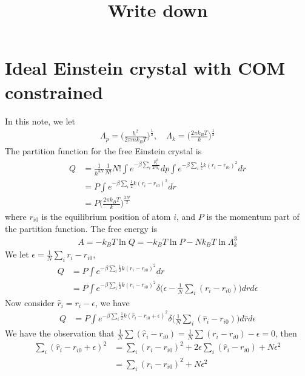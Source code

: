 \documentclass[aps,pre,a4paper,showkeys,fleqn]{revtex4}
\begin{document}
\title{
Write down
}

\maketitle

\section{Ideal Einstein crystal with COM constrained}

In this note, we let
\begin{align*}
  \Lambda_p = \Big(\frac{h^2}{2\pi m k_BT}\Big)^{\frac12}, \quad \Lambda_k = \Big(\frac{2\pi k_BT}{k}\Big)^{\frac12}
\end{align*}
The partition function for the free Einstein crystal is
\begin{align*}
  Q & =
      \frac{1}{h^{3N}}
      \frac{1}{N!} N!
      \int e^{-\beta\sum_i\frac{p_i^2}{2m_i}} dp
      \int e^{-\beta\sum_i \frac 12k(r_i - r_{i0})^2} dr \\
    &=
      P \int e^{-\beta\sum_i \frac 12k(r_i - r_{i0})^2} dr \\
    &=
      P \Big( \frac{2\pi k_BT}{k} \Big)^{\frac{3N}2}
\end{align*}
where $r_{i0}$ is the equilibrium position of atom $i$, and $P$ is the momentum part of the partition function.
The free energy is
\begin{align*}
  A = -k_BT\ln Q = -k_BT\ln P - Nk_BT\ln\Lambda_k^3
\end{align*}
We let $\epsilon = \frac1N \sum_i r_i - r_{i0}$,
\begin{align*}
  Q & =
      P \int e^{-\beta\sum_i \frac 12k(r_i - r_{i0})^2} dr \\
    & =
      P \int e^{-\beta\sum_i \frac 12k(r_i - r_{i0})^2} \delta\big( \epsilon - \frac1N \sum_i (r_i - r_{i0}) \big) dr d\epsilon
\end{align*}
Now consider $\hat r_i = r_i - \epsilon$, we have
\begin{align}\label{eqn:1}
  Q & =
      P \int e^{-\beta\sum_i \frac 12k(\hat r_i - r_{i0} + \epsilon)^2} \delta\big( \frac1N \sum_i (\hat r_i - r_{i0}) \big) d\hat r d\epsilon
\end{align}
We have the observation that $ \frac 1N \sum (\hat r_i  - r_{i0}) = \frac 1N \sum ( r_i  - r_{i0}) - \epsilon = 0$, then
\begin{align*}
  \sum_i (\hat r_i - r_{i0} + \epsilon)^2
  &=
    \sum_i (\hat r_i - r_{i0})^2 + 2\epsilon\sum_i (\hat r_i - r_{i0}) + N\epsilon^2 \\
  &=
    \sum_i (\hat r_i - r_{i0})^2 + N\epsilon^2
\end{align*}
\end{document}

